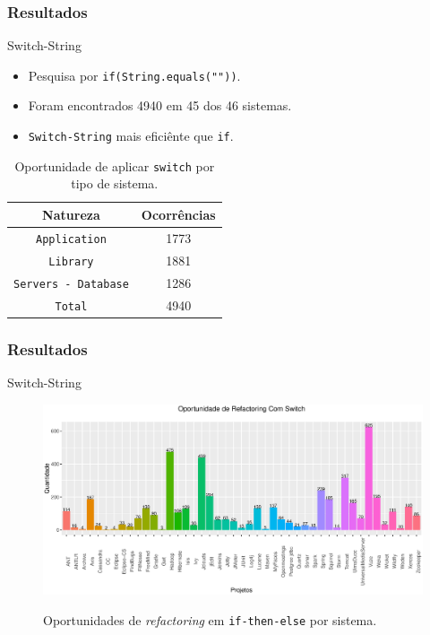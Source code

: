 \documentclass[]{beamer}
\begin{document}
	\begin{frame}[fragile, label=re]\frametitle{Resultados}
		\begin{block}{Switch-String}
			\begin{itemize}
				\item Pesquisa por \texttt{if(String.equals(""))}.
				\item Foram encontrados 4940 em 45 dos 46 sistemas.
				\item \texttt{Switch-String} mais eficiênte que \texttt{if}.
			\end{itemize}
			
			\begin{table}[h]
				\centering
				\caption{Oportunidade de aplicar \texttt{switch} por tipo de sistema.}
				\begin{tabular}{cc}
					\hline
					Natureza & Ocorrências \\ 
					\hline \hline
					\texttt{Application} & 1773 \\ 
					\texttt{Library} & 1881 \\ 
					\texttt{Servers - Database} & 1286 \\ \hline
					\texttt{Total} & 4940 \\ \hline
				\end{tabular}
				\label{tab:oportunidadesSwitchPorNatureza} %
			\end{table}
			
		\end{block}
	\end{frame}
	
	\begin{frame}[fragile, label=re]\frametitle{Resultados}
		\begin{block}{Switch-String}
			\begin{figure}[h]
				\center
				\includegraphics[scale=0.30]{../TCC/Imagens/oportunidadesSwitchString}
				\label{fig:oportunidadesSwitchString}
				\caption{Oportunidades de \textit{refactoring} em \texttt{if-then-else} por sistema.}
			\end{figure}		
		\end{block}
	\end{frame}
	
\end{document}
